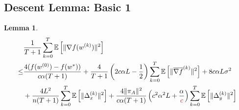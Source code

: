 \documentclass{article}
\newtheorem{lemma}[thm]{Lemma}
\newcommand{\EE}[1]{\mathbb{E}\left[#1\right]}
\newcommand{\norm}[1]{\| #1 \|}
\begin{document}
\subsection{Descent Lemma: Basic 1}
\begin{lemma}\label{basic: descent lemma 1}
  \begin{align*}
    &\frac{1}{T+1}\sum_{k=0}^T\EE{\norm{\nabla f(w^{(k)})}^2}\\ 
  \leq & \frac{4(f(w^{(0)})-f(w^{*}))}{c\alpha(T+1)}+\frac{4}{T+1}\left(2c\alpha L-\frac{1}{2}\right)\sum_{k=0}^T\EE{\norm{\overline{\nabla f}^{(k)}}^2}+8c\alpha L\sigma^2\\&+\frac{ 4L^2}{n(T+1)}\sum_{k=0}^T\EE{\norm{\Delta_x^{(k)}}^2}+\frac{4\norm{\pi_A}^2}{c\alpha(T+1)}\left(c^2\alpha^2L+\frac{\alpha}{\textcolor{red}{c}}\right)\sum_{k=0}^T\EE{\norm{\Delta_{y}^{(k)}}^2}
  \end{align*} 
\end{lemma}
\end{document}
